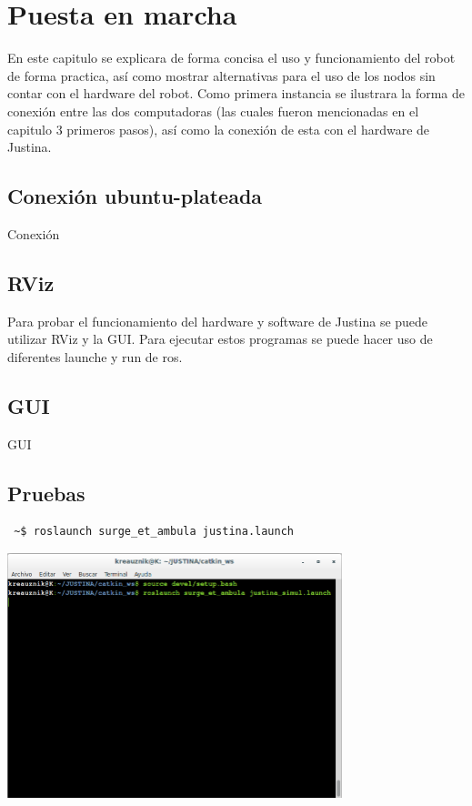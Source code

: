 \documentclass[user_manual.tex]{subfiles}
\begin{document}
\chapter{Puesta en marcha}
En este capitulo se explicara de forma concisa el uso y funcionamiento del robot de forma practica, así como mostrar alternativas para el uso de los nodos sin contar con el hardware del robot. Como primera instancia se ilustrara la forma de conexión entre las dos computadoras (las cuales fueron mencionadas en el capitulo 3 primeros pasos), así como la conexión de esta con el hardware de Justina.

\section{Conexión ubuntu-plateada}
Conexión

\section{RViz}
Para probar el funcionamiento del hardware y software de Justina se puede utilizar RViz y la GUI. Para ejecutar estos programas se puede hacer uso de diferentes launche y run de ros.

\section{GUI}
GUI
\section{Pruebas}
\begin{verbatim}
 ~$ roslaunch surge_et_ambula justina.launch
\end{verbatim}

 \begin{center}
\includegraphics[width=0.73\textwidth]{Figures/PP/pp6.png}
\end{center}
\end{document}
